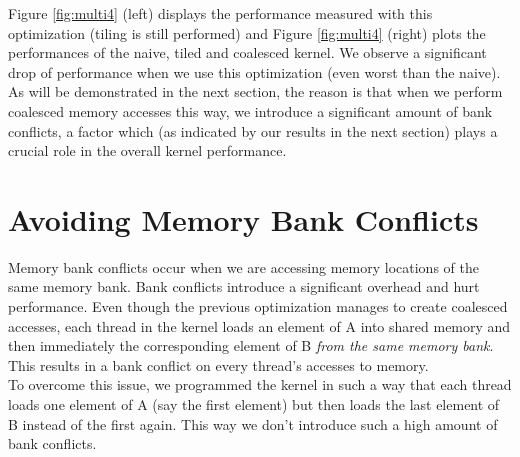 \documentclass[paper=a4, fontsize=11pt]{scrartcl} %
\numberwithin{equation}{section} %
\numberwithin{figure}{section} %
\numberwithin{table}{section} %
\begin{document}
Figure \ref{fig:multi4} (left) displays the performance measured with this optimization (tiling is still performed) and Figure \ref{fig:multi4} (right) plots the performances of the naive, tiled and coalesced kernel. We observe a significant drop of performance when we use this optimization (even worst than the naive). As will be demonstrated in the next section, the reason is that when we perform coalesced memory accesses this way, we introduce a significant amount of bank conflicts, a factor which (as indicated by our results in the next section) plays a crucial role in the overall kernel performance.



\section{\textbf{Avoiding Memory Bank Conflicts}}
Memory bank conflicts occur when we are accessing memory locations of the same memory bank. Bank conflicts introduce a significant overhead and hurt performance. Even though the previous optimization manages to create coalesced accesses, each thread in the kernel loads an element of A into shared memory and then immediately the corresponding element of B \textit{from the same memory bank}. This results in a bank conflict on every thread's accesses to memory.\\

To overcome this issue, we programmed the kernel in such a way that each thread loads one element of A (say the first element) but then loads the last element of B instead of the first again. This way we don't introduce such a high amount of bank conflicts.\\
\end{document}
